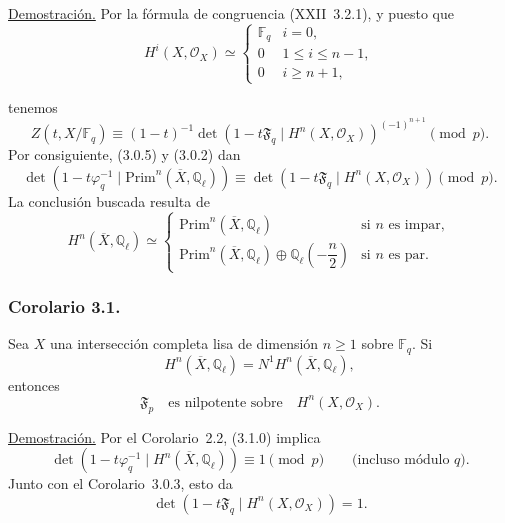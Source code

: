 \noindent\underline{Demostración.}
Por la fórmula de congruencia (XXII~3.2.1), y puesto que
\begin{equation}\tag{3.0.4}
H^i(X,\mathcal O_X)\simeq
\begin{cases}
\mathbb F_q & i=0,\\[1.5ex]
0 & 1\leq i\leq n-1,\\[1.5ex]
0 & i\geq n+1,
\end{cases}
\end{equation}

\pageoriginale

tenemos
\begin{equation}\tag{3.0.5}
Z(t,X/\mathbb F_q)\equiv
(1-t)^{-1}
\det\!\left(1-t\mathfrak F_q\mid H^n(X,\mathcal O_X)\right)^{(-1)^{n+1}}
\pmod p.
\end{equation}
Por consiguiente, (3.0.5) y (3.0.2) dan
\begin{equation}\tag{3.0.6}
\det\!\left(1-t\varphi_q^{-1}\mid
\mathrm{Prim}^n(\overline X,\mathbb Q_\ell)\right)
\equiv
\det\!\left(1-t\mathfrak F_q\mid H^n(X,\mathcal O_X)\right)
\pmod p.
\end{equation}
La conclusión buscada resulta de
\begin{equation}\tag{3.0.7}
H^n(\overline X,\mathbb Q_\ell)\simeq
\begin{cases}
\mathrm{Prim}^n(\overline X,\mathbb Q_\ell) & \text{si $n$ es impar},\\[2mm]
\mathrm{Prim}^n(\overline X,\mathbb Q_\ell)
\oplus\mathbb Q_\ell\!\left(-\dfrac n2\right) & \text{si $n$ es par}.
\end{cases}
\end{equation}

\subsubsection*{Corolario 3.1.}
Sea $X$ una intersección completa lisa de dimensión $n\geq1$ sobre
$\mathbb F_q$. Si
\begin{equation}\tag{3.1.0}
H^n(\overline X,\mathbb Q_\ell)=N^1H^n(\overline X,\mathbb Q_\ell),
\end{equation}
entonces
\begin{equation}\tag{3.1.1}
\mathfrak F_p\quad\text{es nilpotente sobre}\quad H^n(X,\mathcal O_X).
\end{equation}

\noindent\underline{Demostración.}
Por el Corolario~2.2, (3.1.0) implica
\begin{equation}\tag{3.1.2}
\det\!\left(1-t\varphi_q^{-1}\mid
H^n(\overline X,\mathbb Q_\ell)\right)
\equiv1\pmod p
\qquad\text{(incluso módulo $q$)}.
\end{equation}
Junto con el Corolario~3.0.3, esto da
\begin{equation}\tag{3.1.3}
\det\!\left(1-t\mathfrak F_q\mid H^n(X,\mathcal O_X)\right)=1.
\end{equation}

